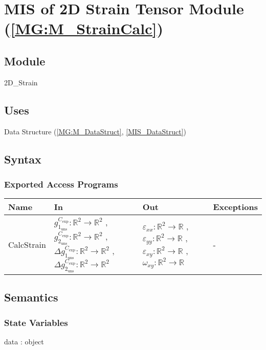 \documentclass[12pt, titlepage]{article}
\begin{document}
\section{MIS of 2D Strain Tensor Module (\texorpdfstring{\cref{MG:M_StrainCalc}}))} \label{MIS_StrainCalc}

\subsection{Module}
2D{\_}Strain
\subsection{Uses}
Data Structure (\cref{MG:M_DataStruct}, \cref{MIS_DataStruct})
\subsection{Syntax}

\subsubsection{Exported Access Programs}

\begin{center}
\begin{tabular}{p{2cm} p{4cm} p{4cm} p{2cm}}
\hline
\textbf{Name} & \textbf{In} & \textbf{Out} & \textbf{Exceptions} \\
\hline
CalcStrain & $g_{1_{{\text{uns}}}}^{C_{\text{exp}}}:\mathbb{R}^2\rightarrow\mathbb{R}^2$ , $g_{2_{{\text{uns}}}}^{C_{\text{exp}}}:\mathbb{R}^2\rightarrow\mathbb{R}^2$ , $\Delta g_{1_{{\text{uns}}}}^{C_{\text{exp}}}:\mathbb{R}^2\rightarrow\mathbb{R}^2$ , $\Delta g_{2_{{\text{uns}}}}^{C_{\text{exp}}}:\mathbb{R}^2\rightarrow\mathbb{R}^2$  & $\varepsilon_{\mathit{xx}}:\mathbb{R}^2\rightarrow\mathbb{R}$ , $\varepsilon_{\mathit{yy}}:\mathbb{R}^2\rightarrow\mathbb{R}$ , $\varepsilon_{\mathit{xy}}:\mathbb{R}^2\rightarrow\mathbb{R}$ , $\omega_{\mathit{xy}}:\mathbb{R}^2\rightarrow\mathbb{R}$ & - \\
\hline
\end{tabular}
\end{center}

\subsection{Semantics}

\subsubsection{State Variables}
data : object
\end{document}
